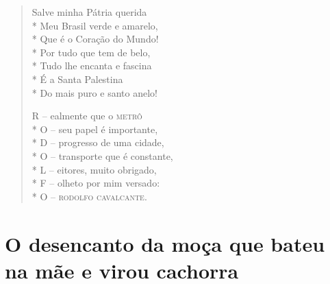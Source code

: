 \begin{verse}
Salve minha Pátria querida\\*
Meu Brasil verde e amarelo,\\*
Que é o Coração do Mundo!\\*
Por tudo que tem de belo,\\*
Tudo lhe encanta e fascina\\*
É a Santa Palestina\\*
Do mais puro e santo anelo!

R -- ealmente que o \textsc{metrô}\\*
O -- seu papel é importante,\\*
D -- progresso de uma cidade,\\*
O -- transporte que é constante,\\*
L -- eitores, muito obrigado,\\*
F -- olheto por mim versado:\\*
O -- \textsc{rodolfo cavalcante}.
\end{verse}

\chapter[O desencanto da moça que bateu na mãe\\ e virou cachorra]{O desencanto da moça que bateu na mãe e virou cachorra}

